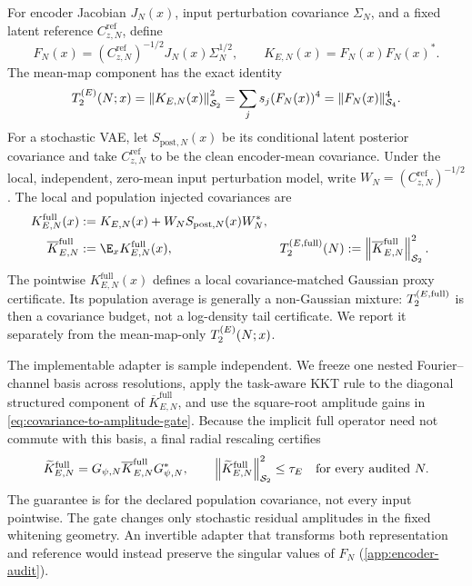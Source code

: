 For encoder Jacobian $J_N(x)$, input perturbation covariance $\Sigma_N$, and a
fixed latent reference $C_{z,N}^{\mathrm{ref}}$, define
\begin{equation}
  F_N(x)=(C_{z,N}^{\mathrm{ref}})^{-1/2}J_N(x)\Sigma_N^{1/2},
  \qquad K_{E,N}(x)=F_N(x)F_N(x)^\ast.
  \label{eq:encoder-pushforward}
\end{equation}
The mean-map component has the exact identity
\begin{equation}
  T_2^{(E)}(N;x)
  =\left\lVert K_{E,N}(x) \right\rVert_{\mathcal{S}_{2}}^2
  =\sum_js_j(F_N(x))^4
  =\lVert F_N(x)\rVert_{\mathcal{S}_{4}}^4.
  \label{eq:encoder-s4-identity}
\end{equation}
For a stochastic VAE, let $S_{\mathrm{post},N}(x)$ be its conditional latent
posterior covariance and take $C_{z,N}^{\mathrm{ref}}$ to be the clean
encoder-mean covariance. Under the local, independent, zero-mean input
perturbation model, write $W_N=(C_{z,N}^{\mathrm{ref}})^{-1/2}$. The local and
population injected covariances are
\begin{equation}
  \begin{aligned}
    K_{E,N}^{\mathrm{full}}(x)
      &:=K_{E,N}(x)+W_NS_{\mathrm{post},N}(x)W_N^\ast,\\
    \overline K_{E,N}^{\mathrm{full}}
      &:=\E_x K_{E,N}^{\mathrm{full}}(x),&
    \Ttwo^{(E,\mathrm{full})}(N)
      &:=\hsnorm{\overline K_{E,N}^{\mathrm{full}}}^2.
  \end{aligned}
  \label{eq:full-encoder-covariance}
\end{equation}
The pointwise $K_{E,N}^{\mathrm{full}}(x)$ defines a local
covariance-matched Gaussian proxy certificate. Its population average is generally a
non-Gaussian mixture: $T_2^{(E,\mathrm{full})}$ is then a covariance budget,
not a log-density tail certificate. We report it separately from the
mean-map-only $T_2^{(E)}(N;x)$.

The implementable adapter is sample independent. We freeze one nested
Fourier--channel basis across resolutions, apply the task-aware KKT rule to the
diagonal structured component of $\overline K_{E,N}^{\mathrm{full}}$, and use
the square-root amplitude gains in
\cref{eq:covariance-to-amplitude-gate}. Because the implicit full operator need
not commute with this basis, a final radial rescaling certifies
\begin{equation}
  \widetilde K_{E,N}^{\mathrm{full}}
  =G_{\psi,N}\overline K_{E,N}^{\mathrm{full}}G_{\psi,N}^\ast,
  \qquad
  \left\lVert \widetilde K_{E,N}^{\mathrm{full}} \right\rVert_{\mathcal{S}_{2}}^2\le\tau_E
  \quad\text{for every audited }N.
  \label{eq:fixed-whitened-latent-gate}
\end{equation}
The guarantee is for the declared population covariance, not every input
pointwise. The gate changes only stochastic residual amplitudes in the fixed
whitening geometry. An invertible adapter that transforms both representation
and reference would instead preserve the singular values of $F_N$
(\cref{app:encoder-audit}).

